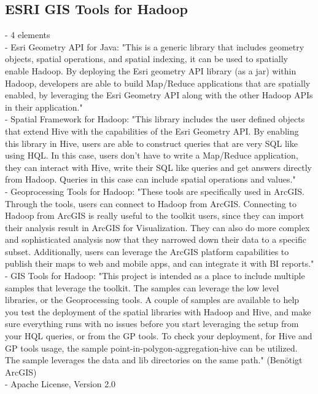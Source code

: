 \subsection{ESRI GIS Tools for Hadoop}
- 4 elements\\
- Esri Geometry API for Java: "This is a generic library that includes geometry objects, spatial operations, and spatial indexing, it can be used to spatially enable Hadoop. By deploying the Esri geometry API library (as a jar) within Hadoop, developers are able to build Map/Reduce applications that are spatially enabled, by leveraging the Esri Geometry API along with the other Hadoop APIs in their application."\cite{website:esri-hadoop2}\\
- Spatial Framework for Hadoop: "This library includes the user defined objects that extend Hive with the capabilities of the Esri Geometry API. By enabling this library in Hive, users are able to construct queries that are very SQL like using HQL. In this case, users don’t have to write a Map/Reduce application, they can interact with Hive, write their SQL like queries and get answers directly from Hadoop. Queries in this case can include spatial operations and values."\cite{website:esri-hadoop2}\\
- Geoprocessing Tools for Hadoop: "These tools are specifically used in ArcGIS. Through the tools, users can connect to Hadoop from ArcGIS. Connecting to Hadoop from ArcGIS is really useful to the toolkit users, since they can import their analysis result in ArcGIS for Visualization. They can also do more complex and sophisticated analysis now that they narrowed down their data to a specific subset. Additionally, users can leverage the ArcGIS platform capabilities to publish their maps to web and mobile apps, and can integrate it with BI reports."\cite{website:esri-hadoop2}\\
- GIS Tools for Hadoop: "This project is intended as a place to include multiple samples that leverage the toolkit. The samples can leverage the low level libraries, or the Geoprocessing tools. A couple of samples are available to help you test the deployment of the spatial libraries with Hadoop and Hive, and make sure everything runs with no issues before you start leveraging the setup from your HQL queries, or from the GP tools. To check your deployment, for Hive and GP tools usage, the sample point-in-polygon-aggregation-hive can be utilized. The sample leverages the data and lib directories on the same path."\cite{website:esri-hadoop2} (Benötigt ArcGIS)\\
- Apache License, Version 2.0

